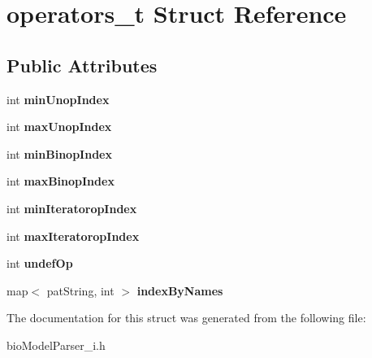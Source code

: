 \hypertarget{structoperators__t}{}\section{operators\+\_\+t Struct Reference}
\label{structoperators__t}
\subsection*{Public Attributes}
\begin{DoxyCompactItemize}
\item 
\mbox{\label{structoperators__t_a0e4489dce1b4f138e6426eea1aa1fb1e}} 
int {\bfseries min\+Unop\+Index}
\item 
\mbox{\label{structoperators__t_a8c5bad76a57290bcbefa7247cf6a0130}} 
int {\bfseries max\+Unop\+Index}
\item 
\mbox{\label{structoperators__t_aae35cfa8dcb009b1f7a19e5b2cd75509}} 
int {\bfseries min\+Binop\+Index}
\item 
\mbox{\label{structoperators__t_a8d62e4ddc0fe30512ce8b63a65e4f861}} 
int {\bfseries max\+Binop\+Index}
\item 
\mbox{\label{structoperators__t_a4d84a815eb0f5e1561c2ff56d1ac7756}} 
int {\bfseries min\+Iteratorop\+Index}
\item 
\mbox{\label{structoperators__t_a61682af0bcb5f9665fb2097908156a58}} 
int {\bfseries max\+Iteratorop\+Index}
\item 
\mbox{\label{structoperators__t_a1bb891e196d43c0a898d29fb8243c132}} 
int {\bfseries undef\+Op}
\item 
\mbox{\label{structoperators__t_a4a96c068dec84f2c9c3cdcc2a43631b5}} 
map$<$ pat\+String, int $>$ {\bfseries index\+By\+Names}
\end{DoxyCompactItemize}


The documentation for this struct was generated from the following file\+:\begin{DoxyCompactItemize}
\item 
bio\+Model\+Parser\+\_\+i.\+h\end{DoxyCompactItemize}
